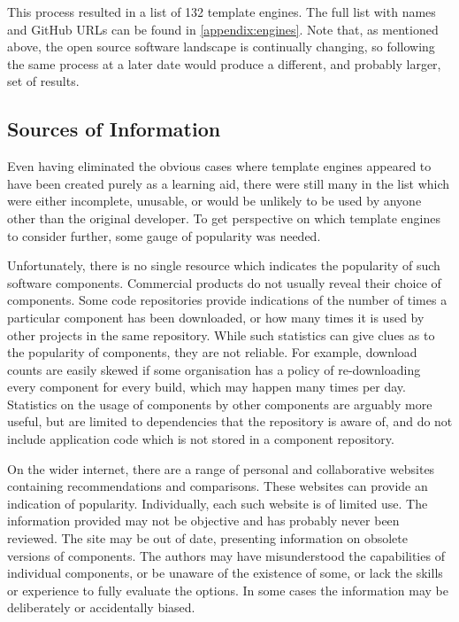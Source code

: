 This process resulted in a list of 132 template engines. The full list with names and GitHub URLs can be found in \autoref{appendix:engines}. Note that, as mentioned above, the open source software landscape is continually changing, so following the same process at a later date would produce a different, and probably larger, set of results.

\subsection{Sources of Information}

Even having eliminated the obvious cases where template engines appeared to have been created purely as a learning aid, there were still many in the list which were either incomplete, unusable, or would be unlikely to be used by anyone other than the original developer. To get perspective on which template engines to consider further, some gauge of popularity was needed.

Unfortunately, there is no single resource which indicates the popularity of such software components. Commercial products do not usually reveal their choice of components. Some code repositories provide indications of the number of times a particular component has been downloaded, or how many times it is used by other projects in the same repository. While such statistics can give clues as to the popularity of components, they are not reliable. For example, download counts are easily skewed if some organisation has a policy of re-downloading every component for every build, which may happen many times per day. Statistics on the usage of components by other components are arguably more useful, but are limited to dependencies that the repository is aware of, and do not include application code which is not stored in a component repository.

On the wider internet, there are a range of personal and collaborative websites containing recommendations and comparisons. These websites can provide an indication of popularity. Individually, each such website is of limited use. The information provided may not be objective and has probably never been reviewed. The site may be out of date, presenting information on obsolete versions of components. The authors may have misunderstood the capabilities of individual components, or be unaware of the existence of some, or lack the skills or experience to fully evaluate the options. In some cases the information may be deliberately or accidentally biased.

